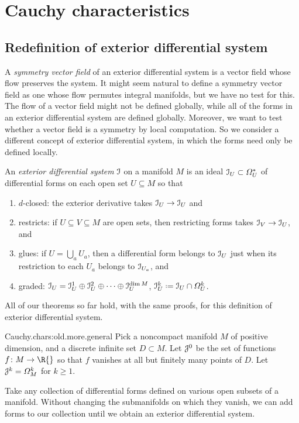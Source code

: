 \chapter{Cauchy characteristics}\label{chapter:Cauchy.characteristics}%
\section{Redefinition of exterior differential system}
A \emph{symmetry vector field} of an exterior differential system is a vector field whose flow preserves the system.
It might seem natural to define a symmetry vector field as one whose flow permutes integral manifolds, but we have no test for this.
The flow of a vector field might not be defined globally, while all of the forms in an exterior differential system are defined globally.
Moreover, we want to test whether a vector field is a symmetry by local computation.
So we consider a different concept of exterior differential system, in which the forms need only be defined locally.

An \emph{exterior differential system} \(\mathcal{I}\) on a manifold \(M\) is an ideal \(\mathcal{I}_U\subset\Omega^{*}_{U}\) of differential forms on each open set \(U\subseteq M\) so that 
\begin{enumerate}
\item\label{def:EDS.2} \(d\)-closed: the exterior derivative takes \(\mathcal{I}_U \to \mathcal{I}_U\) and
\item restricts:
if \(U\subseteq V\subseteq M\) are open sets, then restricting forms takes \(\mathcal{I}_V \to \mathcal{I}_U\), and
\item glues:
if \(U=\bigcup_a U_a\), then a differential form belongs to \(\mathcal{I}_U\) just when its restriction to each \(U_a\) belongs to \(\mathcal{I}_{U_a}\), and
\item graded: \(\mathcal{I}_U=\mathcal{I}_U^1\oplus\mathcal{I}_U^2\oplus\dots\oplus\mathcal{I}_U^{\dim M}\), \(\II_U^k\defeq \II_U \cap \nForms{k}{U}\).
\end{enumerate}
All of our theorems so far hold, with the same proofs, for this definition of exterior differential system.
\begin{answer}{Cauchy.chars:old.more.general}
Pick a noncompact manifold \(M\) of positive dimension, and a discrete infinite set \(D\subset M\).
Let \(\mathcal{J}^0\) be the set of functions \(f\colon M \to \R{}\) so that \(f\) vanishes at all but finitely many points of \(D\).
Let \(\mathcal{J}^k=\Omega^{k}_{M}\) for \(k\ge1\).
\end{answer}
Take any collection of differential forms defined on various open subsets of a manifold.
Without changing the submanifolds on which they vanish, we can add forms to our collection until we obtain an exterior differential system.


